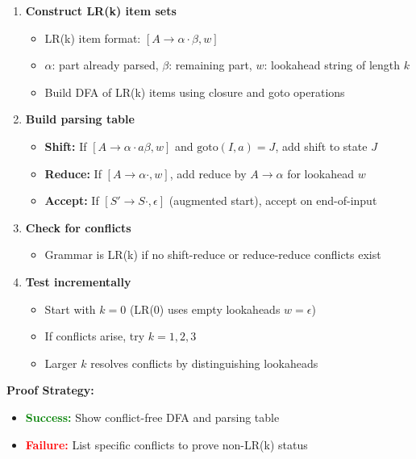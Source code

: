 \begin{enumerate}
    \item \textbf{Construct LR(k) item sets}
    \begin{itemize}
        \item LR(k) item format: $[A \to \alpha \cdot \beta, w]$
        \item $\alpha$: part already parsed, $\beta$: remaining part, $w$: lookahead string of length $k$
        \item Build DFA of LR(k) items using closure and goto operations
    \end{itemize}
    
    \item \textbf{Build parsing table}
    \begin{itemize}
        \item \textbf{Shift:} If $[A \to \alpha \cdot a \beta, w]$ and $\text{goto}(I, a) = J$, add shift to state $J$
        \item \textbf{Reduce:} If $[A \to \alpha \cdot, w]$, add reduce by $A \to \alpha$ for lookahead $w$
        \item \textbf{Accept:} If $[S' \to S \cdot, \epsilon]$ (augmented start), accept on end-of-input
    \end{itemize}
    
    \item \textbf{Check for conflicts}
    \begin{itemize}
        \item Grammar is LR(k) if no shift-reduce or reduce-reduce conflicts exist
    \end{itemize}
    
    \item \textbf{Test incrementally}
    \begin{itemize}
        \item Start with $k = 0$ (LR(0) uses empty lookaheads $w = \epsilon$)
        \item If conflicts arise, try $k = 1, 2, 3$
        \item Larger $k$ resolves conflicts by distinguishing lookaheads
    \end{itemize}
\end{enumerate}

\textbf{Proof Strategy:}
\begin{itemize}
    \item \textcolor{green}{\textbf{Success:}} Show conflict-free DFA and parsing table
    \item \textcolor{red}{\textbf{Failure:}} List specific conflicts to prove non-LR(k) status
\end{itemize}


